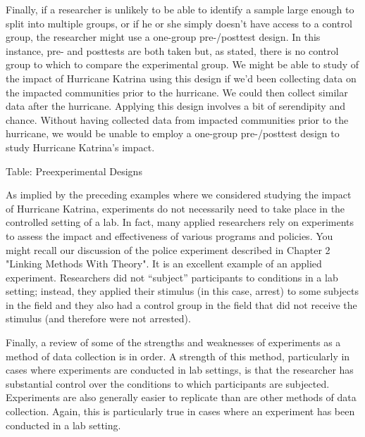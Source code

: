 Finally, if a researcher is unlikely to be able to identify a sample large enough to split into multiple groups, or if he or she simply doesn’t have access to a control group, the researcher might use a one-group pre-/posttest design. In this instance, pre- and posttests are both taken but, as stated, there is no control group to which to compare the experimental group. We might be able to study of the impact of Hurricane Katrina using this design if we’d been collecting data on the impacted communities prior to the hurricane. We could then collect similar data after the hurricane. Applying this design involves a bit of serendipity and chance. Without having collected data from impacted communities prior to the hurricane, we would be unable to employ a one-group pre-/posttest design to study Hurricane Katrina’s impact.

Table: Preexperimental Designs

As implied by the preceding examples where we considered studying the impact of Hurricane Katrina, experiments do not necessarily need to take place in the controlled setting of a lab. In fact, many applied researchers rely on experiments to assess the impact and effectiveness of various programs and policies. You might recall our discussion of the police experiment described in Chapter 2 "Linking Methods With Theory". It is an excellent example of an applied experiment. Researchers did not “subject” participants to conditions in a lab setting; instead, they applied their stimulus (in this case, arrest) to some subjects in the field and they also had a control group in the field that did not receive the stimulus (and therefore were not arrested).

Finally, a review of some of the strengths and weaknesses of experiments as a method of data collection is in order. A strength of this method, particularly in cases where experiments are conducted in lab settings, is that the researcher has substantial control over the conditions to which participants are subjected. Experiments are also generally easier to replicate than are other methods of data collection. Again, this is particularly true in cases where an experiment has been conducted in a lab setting.

